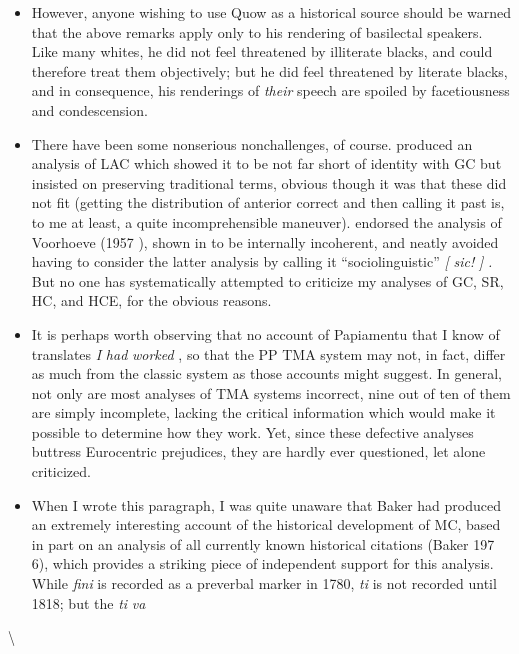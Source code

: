 \begin{itemize}
\begin{itemize}
\begin{itemize}
\begin{itemize}
\begin{itemize}
\item However, anyone wishing to use Quow as a historical source should be warned that the above remarks apply only to his rendering of basilectal speakers. Like many whites, he did not feel threatened by illiterate blacks, and could therefore treat them objectively; but he did feel threatened by literate blacks, and in consequence, his ren\-derings of \textit{their} speech are spoiled by facetiousness and condescension.
\item There have been some nonserious nonchallenges, of course. \citet{Christie1976} produced an analysis of LAC which showed it to be not far short of identity with GC but insisted on preserving traditional terms, obvious though it was that these did not fit (getting the distri\-bution of anterior correct and then calling it past is, to me at least, a quite incomprehensible maneuver). \citet{Seuren1980} endorsed the analysis of Voorhoeve (1957 ), shown in \citet{Bickerton1975} to be intern\-ally incoherent, and neatly avoided having to consider the latter analy\-sis by calling it ``sociolinguistic'' \textit{[} \textit{sic!} \textit{]} \textit{.} But no one has systematically attempted to criticize my analyses of GC, SR, HC, and HCE, for the obvious reasons.
\item It is perhaps worth observing that no account of Papiamentu that I know of translates \textit{I} \textit{had} \textit{worked} , so that the PP TMA system may not, in fact, differ as much from the classic system as those ac\-counts might suggest. In general, not only are most analyses of TMA systems incorrect, nine out of ten of them are simply incomplete, lacking the critical information which would make it possible to deter\-mine how they work. Yet, since these defective analyses buttress Euro\-centric prejudices, they are hardly ever questioned, let alone criticized.
\item When I wrote this paragraph, I was quite unaware that Baker had produced an extremely interesting account of the historical de\-velopment of MC, based in part on an analysis of all currently known historical citations (Baker 197 6), which provides a striking piece of independent support for this analysis. While \textit{fini} is recorded as a pre\-verbal marker in 1780, \textit{ti }is not recorded until 1818; but the \textit{ti} \textit{va}
\end{itemize}

{\textbackslash}


\end{itemize}
\end{itemize}
\end{itemize}
\end{itemize}
